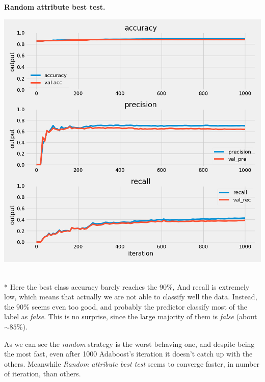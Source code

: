 \documentclass{article}
\begin{document}
\begin{multicols}{2}
	\begin{minipage}[t]{1\columnwidth}
	\begin{center}
	\textbf{Random attribute best test.}\par\medskip
	\includegraphics[width=0.9\columnwidth]{../images/random_selctor_best_test_class_2_cross_val_4.png}
	\label{best}
	\end{center}
	\end{minipage}
	\text{ }
	\\*
	Here the best class accuracy barely reaches the $90\%$, And recall is extremely low, which means that
	actually we are not able to classify well the data. Instead, the $90\%$ seems even too good, and probably
	the predictor classify most of the label as \textit{false}. This is no surprise, since the large majority
	of them is \textit{false} (about $\sim 85 \%$).
	
	As we can see the \textit{random} strategy is the worst behaving one, and despite being the most fast, even after
	1000 Adaboost's iteration it doesn't catch up with the others. Meanwhile \textit{Random attribute best test} seems to
	converge faster, in number of iteration, than others.\\
\end{multicols}
\newpage
\end{document}
